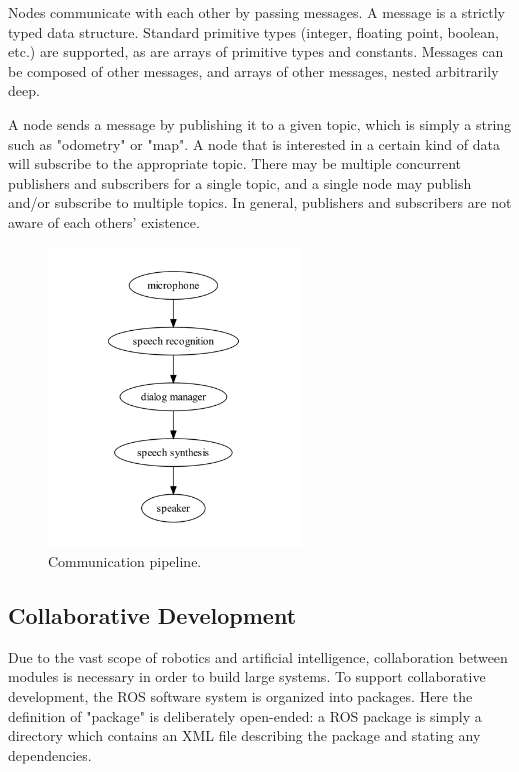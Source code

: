 Nodes communicate with each other by passing messages. A message is a strictly typed data structure. Standard primitive types (integer, floating point, boolean, etc.) are supported, as are arrays of primitive types and constants. Messages can be composed of other messages, and arrays of other messages, nested arbitrarily deep.

A node sends a message by publishing it to a given topic, which is simply a string such as "odometry" or "map". A node that is interested in a certain kind of data will subscribe to the appropriate topic. There may be multiple concurrent publishers and subscribers for a single topic, and a single node may publish and/or subscribe to multiple topics. In general, publishers and subscribers are not aware of each others' existence.

\begin{figure}[h]
\centering
\includegraphics[width=0.6\textwidth]{figs/ch2/ros-pipeline}
\caption{Communication pipeline.}
\end{figure}

\subsection{Collaborative Development}

Due to the vast scope of robotics and artificial intelligence, collaboration between modules is necessary in order to build large systems. To support collaborative development, the ROS software system is organized into packages. Here the definition of "package" is deliberately open-ended: a ROS package is simply a directory which contains an XML file describing the package and stating any dependencies.

